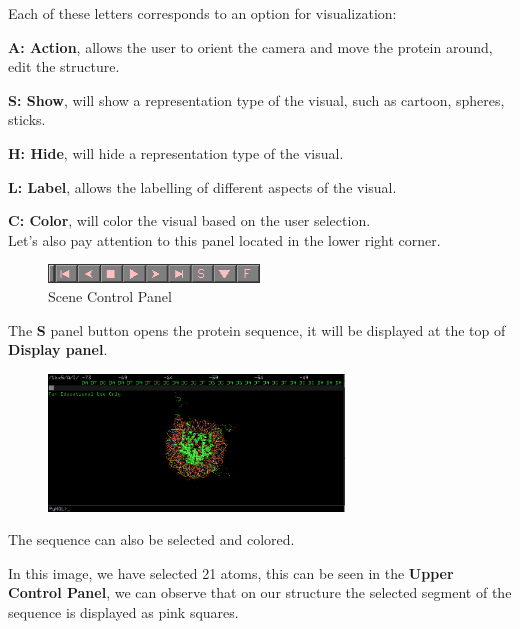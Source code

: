 \documentclass{article}
\begin{document}
Each of these letters corresponds to an option for visualization:

\textbf{A: Action}, allows the user to orient the camera and move the protein around, edit the structure.

\textbf{S: Show}, will show a representation type of the visual, such as cartoon, spheres, sticks.

\textbf{H: Hide}, will hide a representation type of the visual.

\textbf{L: Label}, allows the labelling of different aspects of the visual.

\textbf{C: Color}, will color the visual based on the user selection. \\

Let's also pay attention to this panel located in the lower right corner. \\

\begin{figure}[h!]
    \centering
    \includegraphics[width=0.5\textwidth]{workshops/pymol/imgs/panel.png}
    \caption[]{Scene Control Panel}
    \label{panel}
\end{figure}

The {\color{pink} {\Large \textbf{S}}} panel button opens the protein sequence, it will be displayed at the top of \textbf{Display panel}.

\begin{figure}[h!]
    \centering
    \includegraphics[width=0.7\textwidth]{workshops/pymol/imgs/sequense.png}
    \caption[]{}
    \label{sequence}
\end{figure}

The sequence can also be selected and colored.

In this image, we have selected 21 atoms, this can be seen in the \textbf{Upper Control Panel}, we can observe that on our structure the selected segment of the sequence is displayed as pink squares. \\
\end{document}
